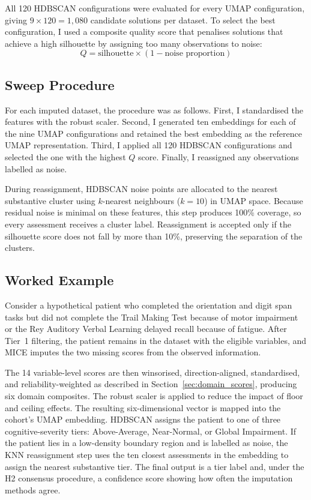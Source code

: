 All 120 HDBSCAN configurations were evaluated for every UMAP configuration, giving $9 \times 120 = 1{,}080$ candidate solutions per dataset. To select the best configuration, I used a composite quality score that penalises solutions that achieve a high silhouette by assigning too many observations to noise:
\begin{equation}
Q = \text{silhouette} \times (1 - \text{noise proportion})
\label{eq:quality}
\end{equation}

\subsection{Sweep Procedure}

For each imputed dataset, the procedure was as follows. First, I standardised the features with the robust scaler. Second, I generated ten embeddings for each of the nine UMAP configurations and retained the best embedding as the reference UMAP representation. Third, I applied all 120 HDBSCAN configurations and selected the one with the highest $Q$ score. Finally, I reassigned any observations labelled as noise.

During reassignment, HDBSCAN noise points are allocated to the nearest substantive cluster using $k$-nearest neighbours ($k=10$) in UMAP space. Because residual noise is minimal on these features, this step produces 100\% coverage, so every assessment receives a cluster label. Reassignment is accepted only if the silhouette score does not fall by more than 10\%, preserving the separation of the clusters.

\subsection{Worked Example}

Consider a hypothetical patient who completed the orientation and digit span tasks but did not complete the Trail Making Test because of motor impairment or the Rey Auditory Verbal Learning delayed recall because of fatigue. After Tier~1 filtering, the patient remains in the dataset with the eligible variables, and MICE imputes the two missing scores from the observed information.

The 14 variable-level scores are then winsorised, direction-aligned, standardised, and reliability-weighted as described in Section~\ref{sec:domain_scores}, producing six domain composites. The robust scaler is applied to reduce the impact of floor and ceiling effects. The resulting six-dimensional vector is mapped into the cohort's UMAP embedding. HDBSCAN assigns the patient to one of three cognitive-severity tiers: Above-Average, Near-Normal, or Global Impairment. If the patient lies in a low-density boundary region and is labelled as noise, the KNN reassignment step uses the ten closest assessments in the embedding to assign the nearest substantive tier. The final output is a tier label and, under the H2 consensus procedure, a confidence score showing how often the imputation methods agree.

